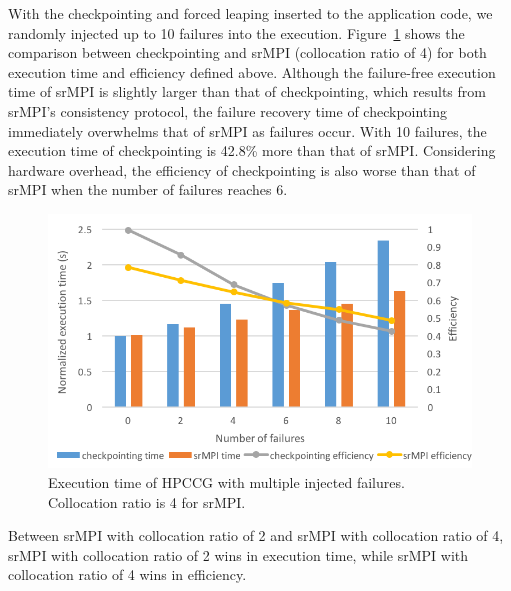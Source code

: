 With the checkpointing and forced leaping inserted to the application code, we randomly injected up to 10 failures into the execution. Figure~\ref{fig:multiple_failure} shows the comparison between checkpointing and srMPI (collocation ratio of 4) for both execution time and efficiency defined above. Although the failure-free execution time of srMPI is slightly larger than that of checkpointing, which results from srMPI's consistency protocol, the failure recovery time of checkpointing immediately overwhelms that of srMPI as failures occur. With 10 failures, the execution time of checkpointing is 42.8\% more than that of srMPI. Considering hardware overhead, the efficiency of checkpointing is also worse than that of srMPI when the number of failures reaches 6.

\begin{figure}[!t]
  \begin{center}
      \includegraphics[width=\columnwidth]{figures/multiple_failure}
  \end{center}
  \caption{Execution time of HPCCG with multiple injected failures. Collocation ratio is 4 for srMPI.}
  \label{fig:multiple_failure}
\end{figure}

Between srMPI with collocation ratio of 2 and srMPI with collocation ratio of 4, srMPI with collocation ratio of 2 wins in execution time, while srMPI with collocation ratio of 4 wins in efficiency. 
